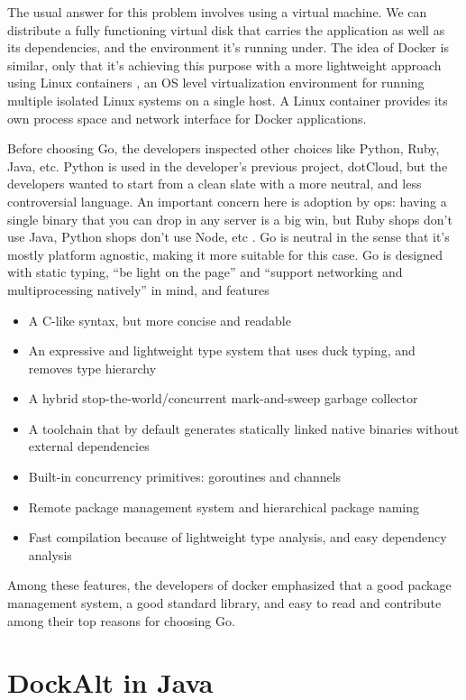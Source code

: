 \documentclass[letterpaper,twocolumn,10pt]{article}
\begin{document}
The usual answer for this problem involves using a virtual machine. We can distribute a fully functioning virtual disk that carries the application as well as its dependencies, and the environment it's running under. The idea of Docker is similar, only that it's achieving this purpose with a more lightweight approach using Linux containers \cite{DockerGithub}, an OS level virtualization environment for running multiple isolated Linux systems on a single host. A Linux container provides its own process space and network interface for Docker applications. \cite{LXC}

Before choosing Go, the developers inspected other choices like Python, Ruby, Java, etc. Python is used in the developer's previous project, dotCloud, but the developers wanted to start from a clean slate with a more neutral, and less controversial language. An important concern here is adoption by ops: having a single binary that you can drop in any server is a big win, but Ruby shops don't use Java, Python shops don't use Node, etc \cite{GopherCon2014}. Go is neutral in the sense that it's mostly platform agnostic, making it more suitable for this case. Go is designed with static typing, ``be light on the page'' and ``support networking and multiprocessing natively'' in mind, and features  \cite{GoWikipedia}
\begin{itemize}
\item A C-like syntax, but more concise and readable
\item An expressive and lightweight type system that uses duck typing, and removes type hierarchy
\item A hybrid stop-the-world/concurrent mark-and-sweep garbage collector
\item A toolchain that by default generates statically linked native binaries without external dependencies
\item Built-in concurrency primitives: goroutines and channels
\item Remote package management system and hierarchical package naming
\item Fast compilation because of lightweight type analysis, and easy dependency analysis \cite{GoSite}
\end{itemize}
Among these features, the developers of docker emphasized that a good package management system, a good standard library, and easy to read and contribute among their top reasons for choosing Go. \cite{GopherCon2014}

\section{DockAlt in Java}
\end{document}
